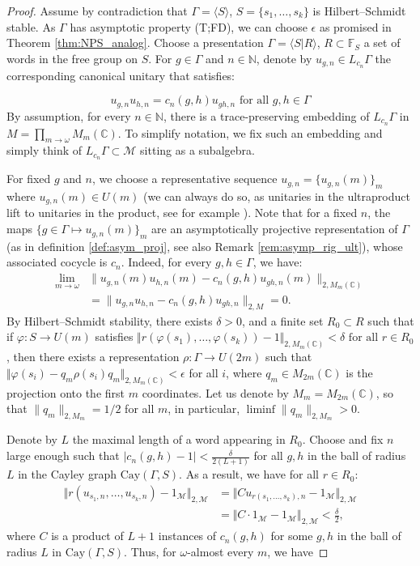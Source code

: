 \documentclass[11pt]{amsart}
\newcommand{\ultlim}[1]{\lim_{#1 \to \omega}}
\newcommand{\C}{{\mathbb{C}}}
\theoremstyle{definition}
\theoremstyle{remark}
\theoremstyle{definition}
\begin{document}
\begin{proof}
Assume by contradiction that $\Gamma = \langle S\rangle$, $S = \{ s_1, \dots, s_k\}$ is Hilbert--Schmidt stable. As $\Gamma$ has asymptotic property (T;FD), we can choose $\epsilon$ as promised in Theorem \ref{thm:NPS_analog}.
Choose a presentation $\Gamma = \langle S \vert R \rangle$, $R \subset \mathbb F_{S}$ a set of words in the free group on $S$.
For $g \in \Gamma$ and $n \in \mathbb N$, denote by $u_{g,n} \in L_{c_n} \Gamma$ the corresponding canonical unitary that satisfies:

$$ u_{g,n} u_{h,n} = c_n(g,h) u_{gh, n} \text{ for all $g,h \in \Gamma$} $$
By assumption, for every $n \in \mathbb N$, there is a trace-preserving embedding of $L_{c_n} \Gamma$ in $M = \prod_{m \to \omega} M_m(\C)$. 
To simplify notation, we fix such an embedding and simply think of $L_{c_n} \Gamma \subset \mathcal M$ sitting as a subalgebra.

For fixed $g$ and $n$, we choose a representative sequence $u_{g,n} = \{ u_{g,n} (m) \}_{m}$ where $u_{g,n}(m) \in U(m)$
(we can always do so, as unitaries in the ultraproduct lift to unitaries in the product, see for example \cite[Lemma 2.2]{zbMATH07469105}). 
Note that for a fixed $n$, the maps $\{ g\in \Gamma \mapsto u_{g,n}(m) \}_m$ are an asymptotically projective representation of $\Gamma$ (as in definition \ref{def:asym_proj}, see also Remark \ref{rem:asymp_rig_ult}), whose associated cocycle is $c_n$.
Indeed, for every $g,h \in \Gamma$, we have:
\begin{align*}
 \ultlim{m}&\| u_{g,n}(m) u_{h,n}(m) - c_n(g,h) u_{gh, n}(m) \|_{2,M_m(\C)} \\
 &= \| u_{g,n} u_{h,n} - c_n(g,h) u_{gh, n}\|_{2,M} =0.
\end{align*}
By Hilbert--Schmidt stability, there exists $\delta > 0$, and a finite set $R_0 \subset R$
such that if $\varphi: S \to U(m)$ satisfies $ \Vert r(\varphi(s_1), \dots, \varphi(s_k)) - 1 \Vert_{2, M_m(\C)} < \delta \text{ for all $r \in R_0$}$, 
then there exists a representation $\rho: \Gamma \to U(2m)$ such that $ \Vert \varphi(s_i) - q_m \rho(s_i) q_m \Vert_{2, M_m(\C)} < \epsilon$ for all $i$, 
where $q_m \in M_{2m}(\C)$ is the projection onto the first $m$ coordinates.
Let us denote by $M_m = M_{2m}(\C)$, so that $\| q_m \|_{2, M_m} = 1/2$ for all $m$, in particular, $\liminf \|q_m \|_{2,M_m} > 0$.

Denote by $L$ the maximal length of a word appearing in $R_0$. Choose and fix $n$ large enough such that 
$\vert c_n(g, h) - 1 \vert < \frac{\delta}{2(L+1)}$ for all $g,h$ in the ball of radius $L$ in the Cayley graph $\text{Cay}(\Gamma, S)$.
As a result, we have for all $r \in R_0$:
\begin{align*}
 \Vert r(u_{s_1,n}, \dots, u_{s_k, n}) - 1_{\mathcal M} \Vert_{2, \mathcal M} &= \Vert C u_{r(s_1, \dots, s_k), n} - 1_{\mathcal M} \Vert_{2, \mathcal M}\\
 &= \Vert C \cdot 1_{\mathcal M} - 1_{\mathcal M} \Vert_{2, \mathcal M} < \frac{\delta}{2},
\end{align*}
where $C$ is a product of $L+1$ instances of $c_n(g,h)$ for some $g,h$ in the ball of radius $L$ in $\text{Cay}(\Gamma, S)$. Thus, for $\omega$-almost every $m$, we have


\end{proof}
\end{document}
